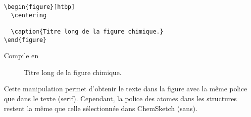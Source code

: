 \begin{verbatim}
\begin{figure}[htbp]
  \centering
  
  \caption{Titre long de la figure chimique.}
\end{figure}
\end{verbatim}

Compile en

\begin{figure}[htbp]
  \centering
  
  \caption{Titre long de la figure chimique.}
\end{figure}

Cette manipulation permet d'obtenir le texte dans la figure avec la même police que dans le texte (serif). Cependant, la police des atomes dans les structures restent la même que celle sélectionnée dans ChemSketch (sans).
